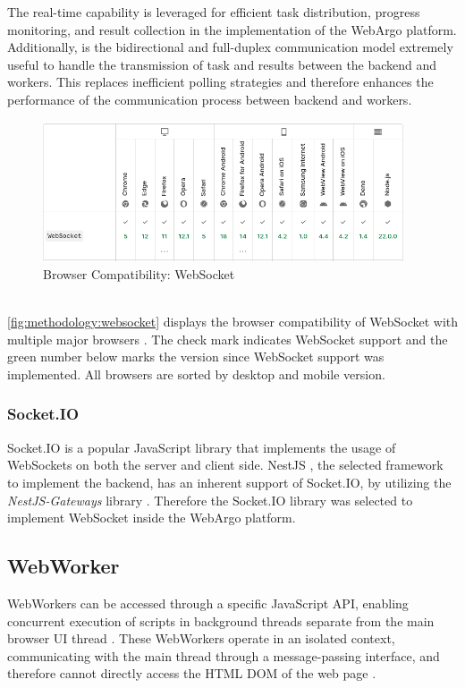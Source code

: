 The real-time capability is leveraged for efficient task distribution, progress monitoring, and result collection in the implementation of the WebArgo platform. Additionally, is the bidirectional and full-duplex communication model extremely useful to handle the transmission of task and results between the backend and workers. This replaces inefficient polling strategies and therefore enhances the performance of the communication process between backend and workers.
\begin{figure}[htbp]
  \centering
  \includegraphics[width=0.95\textwidth]{gfx/figures/websocket-browsercompability.png}
  \caption{Browser Compatibility: WebSocket \cite{methodology:websockets1}}
  \label{fig:methodology:websocket}
\end{figure}
~\\
\autoref{fig:methodology:websocket} displays the browser compatibility of WebSocket with multiple major browsers \cite{methodology:websockets1}. The check mark indicates WebSocket support and the green number below marks the version since WebSocket support was implemented. All browsers are sorted by desktop and mobile version.

\subsubsection{Socket.IO}
Socket.IO \cite{methodology:websockets2} is a popular JavaScript library that implements the usage of WebSockets on both the server and client side. NestJS \cite{methodology:nestjs}, the selected framework to implement the backend, has an inherent support of Socket.IO, by utilizing the \emph{NestJS-Gateways} library \cite{methodology:nestjs}. Therefore the Socket.IO library was selected to implement WebSocket inside the WebArgo platform.

\subsection{WebWorker}
\label{sec:methodology:webworker}
WebWorkers can be accessed through a specific JavaScript \ac{API}, enabling concurrent execution of scripts in background threads separate from the main browser UI thread \cite{methodology:webworkers}. These WebWorkers operate in an isolated context, communicating with the main thread through a message-passing interface, and therefore cannot directly access the \acs{HTML} \acs{DOM} of the web page \cite{methodology:webworkers}. 

